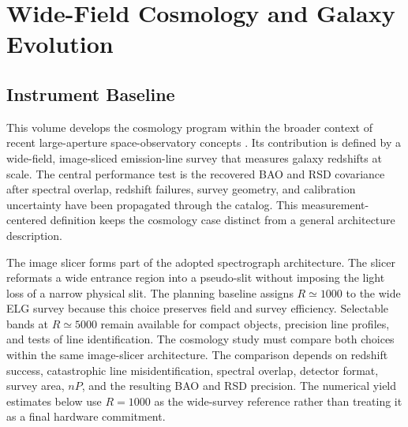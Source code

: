 \chapter{Wide-Field Cosmology and Galaxy Evolution}\label{app:cosmology}

\vspace{2mm}
\begin{center}
\end{center}

\section{Instrument Baseline}

This volume develops the cosmology program within the broader context of
recent large-aperture space-observatory concepts \cite{roy2026II,wevers2026II}.
Its contribution is defined by a wide-field, image-sliced emission-line
survey that measures galaxy redshifts at scale. The central performance
test is the recovered BAO and RSD covariance after spectral overlap,
redshift failures, survey geometry, and calibration uncertainty have been
propagated through the catalog. This measurement-centered definition keeps
the cosmology case distinct from a general architecture description.

The image slicer forms part of the adopted spectrograph architecture. The slicer reformats a wide entrance region into a pseudo-slit without imposing the light loss of a narrow physical slit. The planning baseline assigns $R\simeq1000$ to the wide ELG survey because this choice preserves field and survey efficiency. Selectable bands at $R\simeq5000$ remain available for compact objects, precision line profiles, and tests of line identification. The cosmology study must compare both choices within the same image-slicer architecture. The comparison depends on redshift success, catastrophic line misidentification, spectral overlap, detector format, survey area, $nP$, and the resulting BAO and RSD precision. The numerical yield estimates below use $R=1000$ as the wide-survey reference rather than treating it as a final hardware commitment.

